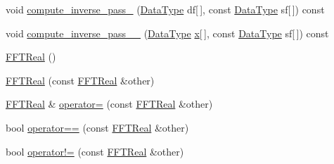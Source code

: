 \begin{DoxyCompactItemize}
\item 
void \hyperlink{classffft_1_1FFTReal_a509266997c0de51dc63ce9b4a50e7d3c}{compute\+\_\+inverse\+\_\+pass\+\_} (\hyperlink{classffft_1_1FFTReal_a606148f1cf8c3b7d705473932fc063d1}{Data\+Type} df\mbox{[}$\,$\mbox{]}, const \hyperlink{classffft_1_1FFTReal_a606148f1cf8c3b7d705473932fc063d1}{Data\+Type} sf\mbox{[}$\,$\mbox{]}) const 
\item 
void \hyperlink{classffft_1_1FFTReal_a8d059fd4e6798c30ca6b9cab089cba68}{compute\+\_\+inverse\+\_\+pass\+\_\+\_} (\hyperlink{classffft_1_1FFTReal_a606148f1cf8c3b7d705473932fc063d1}{Data\+Type} \hyperlink{FFTReal__readme_8txt_a9c92ac89d1560f812393ca39a19e581e}{x}\mbox{[}$\,$\mbox{]}, const \hyperlink{classffft_1_1FFTReal_a606148f1cf8c3b7d705473932fc063d1}{Data\+Type} sf\mbox{[}$\,$\mbox{]}) const 
\item 
\hyperlink{classffft_1_1FFTReal_abb05c7093d0c905e4c3b3e1285bee8a4}{F\+F\+T\+Real} ()
\item 
\hyperlink{classffft_1_1FFTReal_a9ad7353cb1205c00d77f69b9d3362ba3}{F\+F\+T\+Real} (const \hyperlink{classffft_1_1FFTReal}{F\+F\+T\+Real} \&other)
\item 
\hyperlink{classffft_1_1FFTReal}{F\+F\+T\+Real} \& \hyperlink{classffft_1_1FFTReal_a65d44f8ea83d40a8e49ec9c90f6689d3}{operator=} (const \hyperlink{classffft_1_1FFTReal}{F\+F\+T\+Real} \&other)
\item 
bool \hyperlink{classffft_1_1FFTReal_a3569dbeffa58f00d8e4690a46be85292}{operator==} (const \hyperlink{classffft_1_1FFTReal}{F\+F\+T\+Real} \&other)
\item 
bool \hyperlink{classffft_1_1FFTReal_a0ab668257cd92ab58418bbfd4a248afe}{operator!=} (const \hyperlink{classffft_1_1FFTReal}{F\+F\+T\+Real} \&other)
\end{DoxyCompactItemize}
